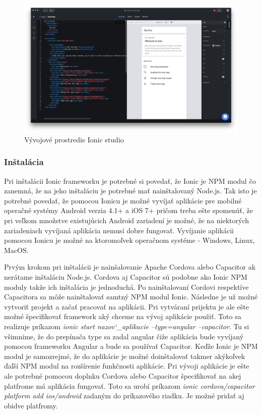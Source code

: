 \begin{figure}[H]
    \centering
    \includegraphics[scale=0.12]{img/ionic_studio.png}
    \caption{Vývojové prostredie Ionic studio}
    \label{fig:ionic_studio}
\end{figure}

\subsubsection{Inštalácia}
\indent Pri inštalácii Ionic frameworku je potrebné si povedať, že Ionic je NPM modul čo zanemná, že na jeho inštaláciu je potrebné mať nainštalovaný Node.js. Tak isto je potrebné povedať, že pomocou Ionicu je možné vyvíjať aplikácie pre mobilné operačné systémy Android verzia 4.1+ a iOS 7+ pričom treba ešte spomenúť, že pri veľkom množstve existujúcich Android zariadení je možné, že na niektorých zariadeniach vyvíjaná aplikácia nemusí dobre fungovať. Vyvíjanie aplikácii pomocou Ionicu je možné na ktoromoľvek operačnom systéme - Windows, Linux, MacOS. 

\indent Prvým krokom pri inštalácii je nainšalovanie Apache Cordova alebo Capacitor ak nerátame inštaláciu Node.js. Cordova aj Capacitor sú podobne ako Ionic NPM moduly takže ich inštalácia je jednoduchá. Po nainštalovaní Cordovi respektíve Capacitora sa môže nainštalovať samtný NPM modul Ionic. Následne je už možné vytvoriť projekt a začať pracovať na aplikácii. Pri vytváraní prijektu je ale ešte možné špecifikovať framework aký chceme na vývoj aplikácie použiť. Toto sa realizuje príkazom \textit{ionic start nazov\char`_aplikacie --type=angular --capacitor}. Tu si všimnime, že do prepínača type sa zadal angular čiže aplikácia bude vyvíjaný pomocou frameworku Angular a bude sa používať Capacitor. Keďže Ionic je NPM modul je samozrejmé, že do aplikácie je možné doinštalovať takmer akýkoľvek ďaľší NPM modul na rozšírenie funkčnosti aplikácie. Pri vývoji aplikácie je ešte ale potrebné pomocou doplnku Cordova alebo Capacitor špecifikovať na akej platfrome má aplikácia fungovať. Toto sa urobí príkazom \textit{ionic cordova/capacitor platform add ios/android} zadaným do príkazového riadku. Je možné pridať aj obidve platfromy. 

